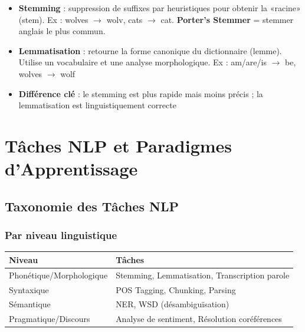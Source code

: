 \documentclass[a4paper,10pt]{article}
\begin{document}
\begin{definitionbox}
\begin{itemize}
  \item \textbf{Stemming} : suppression de suffixes par heuristiques pour obtenir la «racine» (stem). Ex : wolves $\rightarrow$ wolv, cats $\rightarrow$ cat. \textbf{Porter's Stemmer} = stemmer anglais le plus commun.
  \item \textbf{Lemmatisation} : retourne la forme canonique du dictionnaire (lemme). Utilise un vocabulaire et une analyse morphologique. Ex : am/are/is $\rightarrow$ be, wolves $\rightarrow$ wolf
  \item \textbf{Différence clé} : le stemming est plus rapide mais moins précis ; la lemmatisation est linguistiquement correcte
\end{itemize}
\end{definitionbox}

\section{Tâches NLP et Paradigmes d'Apprentissage}

\subsection{Taxonomie des Tâches NLP}

\subsubsection{Par niveau linguistique}
\begin{center}
\begin{tabular}{ll}
\toprule
\textbf{Niveau} & \textbf{Tâches} \\
\midrule
Phonétique/Morphologique & Stemming, Lemmatisation, Transcription parole \\
Syntaxique & POS Tagging, Chunking, Parsing \\
Sémantique & NER, WSD (désambiguïsation) \\
Pragmatique/Discours & Analyse de sentiment, Résolution coréférences \\
\bottomrule
\end{tabular}
\end{center}
\end{document}
